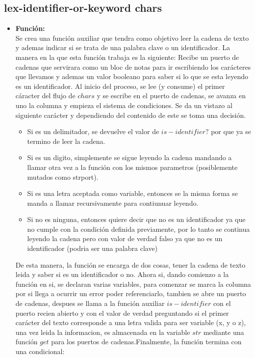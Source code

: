 \documentclass{article}
\begin{document}
\subsection{lex-identifier-or-keyword chars}
\begin{itemize}
    \item \textbf{Función:} \\
    Se crea una función auxiliar que tendra como objetivo leer la cadena de texto y ademas indicar si se trata de una palabra clave o un identificador. La manera en la que esta función trabaja es la siguiente: Recibe un puerto de cadenas que servirara como un bloc de notas para ir escribiendo los carácteres que llevamos y ademas un valor booleano para saber si lo que se esta leyendo es un identificador. Al inicio del proceso, se lee (y consume) el primer cáracter del flujo de $chars$ y se escribe en el puerto de cadenas, se avanza en uno la columna y empieza el sistema de condiciones. Se da un vistazo al siguiente carácter y dependiendo del contenido de este se toma una decisión.
    \begin{itemize}
        \item Si es un delimitador, se devuelve el valor de $is-identifier?$ por que ya se termino de leer la cadena.\\
        \item Si es un digito, simplemente se sigue leyendo la cadena mandando a llamar otra vez a la función con los mismos parametros (posiblemente mutados como strport).\\
        \item Si es una letra aceptada como variable, entonces se la misma forma se manda a llamar recursivamente para contiunuar leyendo.\\
        \item Si no es ninguna, entonces quiere decir que no es un identificador ya que no cumple con la condición definida previamente, por lo tanto se continua leyendo la cadena pero con valor de verdad falso ya que no es un identificador (podria ser una palabra clave)\\
    \end{itemize}
    De esta manera, la función se encarga de dos cosas, tener la cadena de texto leida y saber si es un identificador o no. Ahora si, dando comienzo a la función en si, se declaran varias variables, para comenzar se marca la columna por si llega a ocurrir un error poder referenciarlo, tambien se abre un puerto de cadenas, despues se llama a la función auxiliar $is-identifier$ con el puerto recien abierto y con el valor de verdad preguntando si el primer carácter del texto corresponde a una letra valida para ser variable (x, y o z), una vez leida la informacion, es almacenada en la variable $str$ mediante una función $get$ para los puertos de cadenas.Finalmente, la función termina con una condicional:

\end{itemize}
\end{document}

